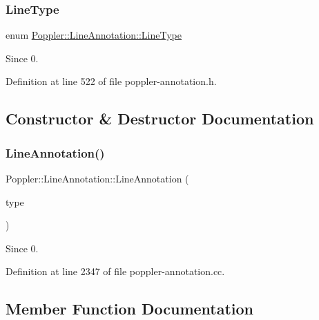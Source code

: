 \subsubsection{\texorpdfstring{Line\+Type}{LineType}}
{\footnotesize\ttfamily enum \hyperlink{class_poppler_1_1_line_annotation_a0bcd4ea8f032803eb08e0411f78e0304}{Poppler\+::\+Line\+Annotation\+::\+Line\+Type}}

\begin{DoxySince}{Since}
0. 
\end{DoxySince}


Definition at line 522 of file poppler-\/annotation.\+h.



\subsection{Constructor \& Destructor Documentation}
\mbox{\label{class_poppler_1_1_line_annotation_a4d620567cdda702ef2d53099daf3660e}} 
\subsubsection{\texorpdfstring{Line\+Annotation()}{LineAnnotation()}}
{\footnotesize\ttfamily Poppler\+::\+Line\+Annotation\+::\+Line\+Annotation (\begin{DoxyParamCaption}\item[{\hyperlink{class_poppler_1_1_line_annotation_a0bcd4ea8f032803eb08e0411f78e0304}{Line\+Annotation\+::\+Line\+Type}}]{type }\end{DoxyParamCaption})}

\begin{DoxySince}{Since}
0. 
\end{DoxySince}


Definition at line 2347 of file poppler-\/annotation.\+cc.



\subsection{Member Function Documentation}
\mbox{\label{class_poppler_1_1_line_annotation_af942cddff4c5cbaca75e5ef2fc323408}} 
